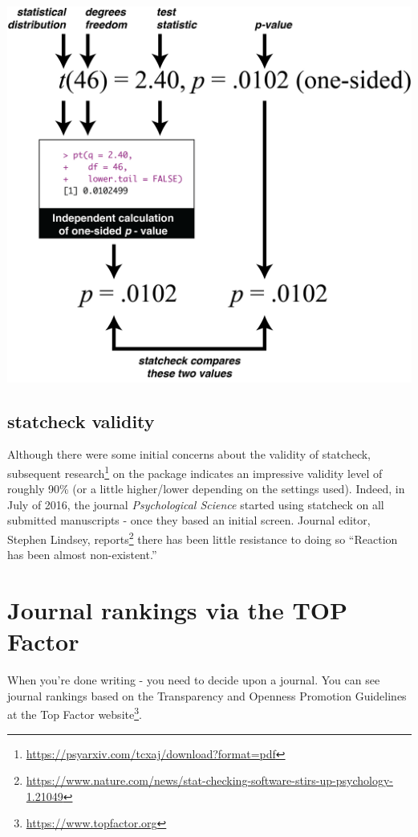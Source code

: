 \documentclass[
]{krantz}
\renewcommand{\href}[2]{#2\footnote{\url{#1}}}
\begin{document}
\includegraphics[width=0.8\linewidth]{ch_tools/images/statcheck_process}

\hypertarget{statcheck-validity}{%
\subsection{statcheck validity}\label{statcheck-validity}}

Although there were some initial concerns about the validity of statcheck, subsequent \href{https://psyarxiv.com/tcxaj/download?format=pdf}{research} on the package indicates an impressive validity level of roughly 90\% (or a little higher/lower depending on the settings used). Indeed, in July of 2016, the journal \emph{Psychological Science} started using statcheck on all submitted manuscripts - once they based an initial screen. Journal editor, Stephen Lindsey, \href{https://www.nature.com/news/stat-checking-software-stirs-up-psychology-1.21049}{reports} there has been little resistance to doing so ``Reaction has been almost non-existent.''

\hypertarget{journal-rankings-via-the-top-factor}{%
\section{Journal rankings via the TOP Factor}\label{journal-rankings-via-the-top-factor}}

When you're done writing - you need to decide upon a journal. You can see journal rankings based on the Transparency and Openness Promotion Guidelines at the \href{https://www.topfactor.org}{Top Factor website}.
\end{document}
